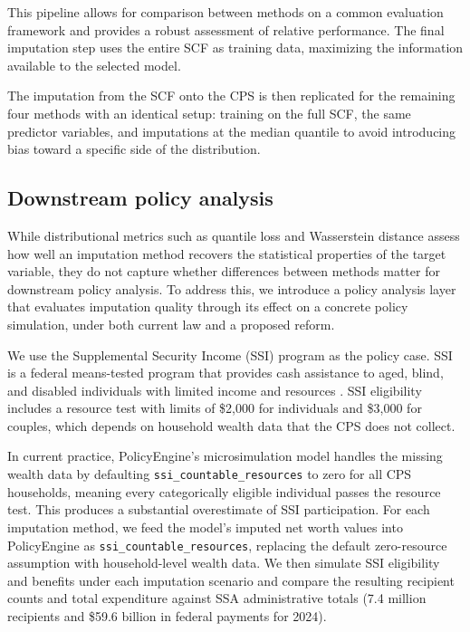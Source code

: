 This pipeline allows for comparison between methods on a common evaluation framework and provides a robust assessment of relative performance. The final imputation step uses the entire SCF as training data, maximizing the information available to the selected model.

The imputation from the SCF onto the CPS is then replicated for the remaining four methods with an identical setup: training on the full SCF, the same predictor variables, and imputations at the median quantile to avoid introducing bias toward a specific side of the distribution.

\subsection{Downstream policy analysis}\label{sec:policy_validation}

While distributional metrics such as quantile loss and Wasserstein distance assess how well an imputation method recovers the statistical properties of the target variable, they do not capture whether differences between methods matter for downstream policy analysis. To address this, we introduce a policy analysis layer that evaluates imputation quality through its effect on a concrete policy simulation, under both current law and a proposed reform.

We use the Supplemental Security Income (SSI) program as the policy case. SSI is a federal means-tested program that provides cash assistance to aged, blind, and disabled individuals with limited income and resources \citep{ssa2023ssi}. SSI eligibility includes a resource test with limits of \$2,000 for individuals and \$3,000 for couples, which depends on household wealth data that the CPS does not collect.

In current practice, PolicyEngine's microsimulation model \citep{policyengine_us} handles the missing wealth data by defaulting \texttt{ssi\_countable\_resources} to zero for all CPS households, meaning every categorically eligible individual passes the resource test. This produces a substantial overestimate of SSI participation. For each imputation method, we feed the model's imputed net worth values into PolicyEngine as \texttt{ssi\_countable\_resources}, replacing the default zero-resource assumption with household-level wealth data. We then simulate SSI eligibility and benefits under each imputation scenario and compare the resulting recipient counts and total expenditure against SSA administrative totals (7.4 million recipients and \$59.6 billion in federal payments for 2024).

